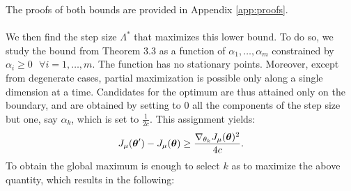 The proofs of both bounds are provided in Appendix \ref{app:proofs}.
\paragraph{}
We then find the step size $\Lambda^*$ that maximizes this lower bound. To do so, we study the bound from Theorem 3.3 as a function of $\alpha_1,\dotsc,\alpha_m$ constrained by $\alpha_i \geq 0 \:\:\: \forall i=1,\dotsc,m$. The function has no stationary points. Moreover, except from degenerate cases, partial maximization is possible only along a single dimension at a time. Candidates for the optimum are thus attained only on the boundary, and are obtained by setting to $0$ all the components of the step size but one, say $\alpha_k$, which is set to $\frac{1}{2c}$.
This assignment yields:
\[
J_{\mu}(\boldsymbol{\theta}') - J_{\mu}(\boldsymbol{\theta}) \geq  \frac{\nabla_{\theta_k}J_\mu(\boldsymbol{\theta})^2}{4c}.
\]
To obtain the global maximum is enough to select $k$ as to maximize the above quantity, which results in the following:

